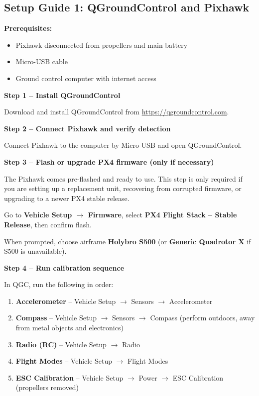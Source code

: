 \documentclass{article}
\begin{document}
\subsection{Setup Guide 1: QGroundControl and Pixhawk}
\label{sec:firmware}

\textbf{Prerequisites:}
\begin{itemize}
    \item Pixhawk disconnected from propellers and main battery
    \item Micro-USB cable
    \item Ground control computer with internet access
\end{itemize}

\textbf{Step 1 -- Install QGroundControl}

Download and install QGroundControl from \url{https://qgroundcontrol.com}.


\textbf{Step 2 -- Connect Pixhawk and verify detection}

Connect Pixhawk to the computer by Micro-USB and open QGroundControl.

\textbf{Step 3 -- Flash or upgrade PX4 firmware (only if necessary)}

The Pixhawk comes pre-flashed and ready to use. This step is only required if you are setting up a replacement unit, recovering from corrupted firmware, or upgrading to a newer PX4 stable release.

Go to \textbf{Vehicle Setup $\rightarrow$ Firmware}, select \textbf{PX4 Flight Stack -- Stable Release}, then confirm flash.

When prompted, choose airframe \textbf{Holybro S500} (or \textbf{Generic Quadrotor X} if S500 is unavailable).

\textbf{Step 4 -- Run calibration sequence}
\label{sec:calibration}

In QGC, run the following in order:
\begin{enumerate}
    \item \textbf{Accelerometer} -- Vehicle Setup $\rightarrow$ Sensors $\rightarrow$ Accelerometer
    \item \textbf{Compass} -- Vehicle Setup $\rightarrow$ Sensors $\rightarrow$ Compass (perform outdoors, away from metal objects and electronics)
    \item \textbf{Radio (RC)} -- Vehicle Setup $\rightarrow$ Radio
    \item \textbf{Flight Modes} -- Vehicle Setup $\rightarrow$ Flight Modes
    \item \textbf{ESC Calibration} -- Vehicle Setup $\rightarrow$ Power $\rightarrow$ ESC Calibration (propellers removed)
\end{enumerate}
\end{document}
